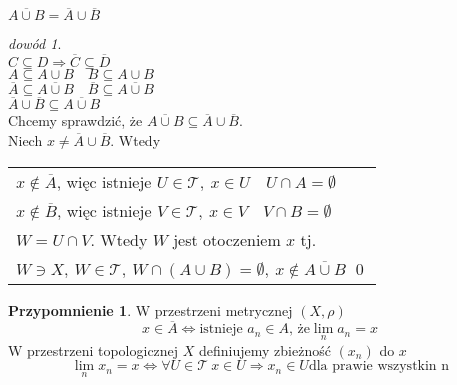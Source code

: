\documentclass[twoside,10pt]{article}
\theoremstyle{definition}
\theoremstyle{definition}
\theoremstyle{definition}
\theoremstyle{definition}
\theoremstyle{remark}
\newtheorem*{dd}{dowód}
\theoremstyle{definition}
\theoremstyle{definition}
\theoremstyle{definition}
\theoremstyle{definition}
\theoremstyle{definition}
\theoremstyle{definition}
\newtheorem*{przyp}{Przypomnienie}
\begin{document}
\begin{tw} 
    $\overline{A \cup B} = \overline A \cup \overline B$
\end{tw} 
\begin{dd} ~\\
    $C \subseteq D \Rightarrow \overline C \subseteq \overline D$ \\ 
    $A \subseteq A \cup B \quad B \subseteq A \cup B$ \\ 
    $\overline A \subseteq \overline{A \cup B} \quad \overline B \subseteq \overline{A \cup B}$ \\ 
    $\overline A \cup \overline B \subseteq \overline{A \cup B}$ \\ 
    Chcemy sprawdzić, że $\overline{A \cup B} \subseteq \overline A \cup \overline B$. \\ 
    Niech $x \neq \overline A \cup \overline B$. Wtedy
    \begin{tabular}[t]{l} 
    $x \notin \overline A$, więc istnieje $U \in \mathcal T,\ x \in U \quad U \cap A = \emptyset$ \\ 
    $x \notin \overline B$, więc istnieje $V \in \mathcal T,\ x \in V \quad V \cap B = \emptyset$ \\ 
    $W = U \cap V$. Wtedy $W$ jest otoczeniem $x$ tj. \\ 
    $W \ni X, \ W \in \mathcal T, \ W \cap (A \cup B) = \emptyset,
    \ x \notin \overline{A \cup B}$
    \hfill \qed
    \end{tabular}
\end{dd} 
\begin{przyp} 
    W przestrzeni metrycznej $(X,\rho)$ 
    \[ x \in \overline A \Leftrightarrow \text{istnieje } a_n \in A \text{, że} \lim_n a_n = x \]
    W przestrzeni topologicznej $X$ definiujemy zbieżność $(x_n)$ do $x$ 
    \[ \lim_n x_n = x \Leftrightarrow \forall U \in \mathcal T \ x \in U \Rightarrow x_n \in U \text{dla prawie 
    wszystkin n}\]
\end{przyp} 
\end{document}

